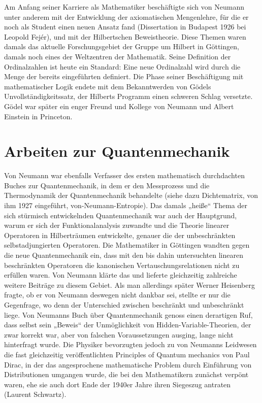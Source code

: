 Am Anfang seiner Karriere als Mathematiker beschäftigte sich von Neumann unter anderem mit der Entwicklung der axiomatischen Mengenlehre, für die er noch als Student einen neuen Ansatz fand (Dissertation in Budapest 1926 bei Leopold Fejér), und mit der Hilbertschen Beweistheorie. Diese Themen waren damals das aktuelle Forschungsgebiet der Gruppe um Hilbert in Göttingen, damals noch eines der Weltzentren der Mathematik. Seine Definition der Ordinalzahlen ist heute ein Standard: Eine neue Ordinalzahl wird durch die Menge der bereits eingeführten definiert. Die Phase seiner Beschäftigung mit mathematischer Logik endete mit dem Bekanntwerden von Gödels Unvollständigkeitssatz, der Hilberts Programm einen schweren Schlag versetzte. Gödel war später ein enger Freund und Kollege von Neumann und Albert Einstein in Princeton.

\section{Arbeiten zur Quantenmechanik}

Von Neumann war ebenfalls Verfasser des ersten mathematisch durchdachten Buches zur Quantenmechanik, in dem er den Messprozess und die Thermodynamik der Quantenmechanik behandelte (siehe dazu Dichtematrix, von ihm 1927 eingeführt, von-Neumann-Entropie). Das damals „heiße“ Thema der sich stürmisch entwickelnden Quantenmechanik war auch der Hauptgrund, warum er sich der Funktionalanalysis zuwandte und die Theorie linearer Operatoren in Hilberträumen entwickelte, genauer die der unbeschränkten selbstadjungierten Operatoren. Die Mathematiker in Göttingen wandten gegen die neue Quantenmechanik ein, dass mit den bis dahin untersuchten linearen beschränkten Operatoren die kanonischen Vertauschungsrelationen nicht zu erfüllen waren. Von Neumann klärte das und lieferte gleichzeitig zahlreiche weitere Beiträge zu diesem Gebiet. Als man allerdings später Werner Heisenberg fragte, ob er von Neumann deswegen nicht dankbar sei, stellte er nur die Gegenfrage, wo denn der Unterschied zwischen beschränkt und unbeschränkt liege.\cite{bams} Von Neumanns Buch über Quantenmechanik genoss einen derartigen Ruf, dass selbst sein „Beweis“ der Unmöglichkeit von Hidden-Variable-Theorien, der zwar korrekt war, aber von falschen Voraussetzungen ausging, lange nicht hinterfragt wurde. Die Physiker bevorzugten jedoch zu von Neumanns Leidwesen die fast gleichzeitig veröffentlichten Principles of Quantum mechanics von Paul Dirac, in der das angesprochene mathematische Problem durch Einführung von Distributionen umgangen wurde, die bei den Mathematikern zunächst verpönt waren, ehe sie auch dort Ende der 1940er Jahre ihren Siegeszug antraten (Laurent Schwartz).

